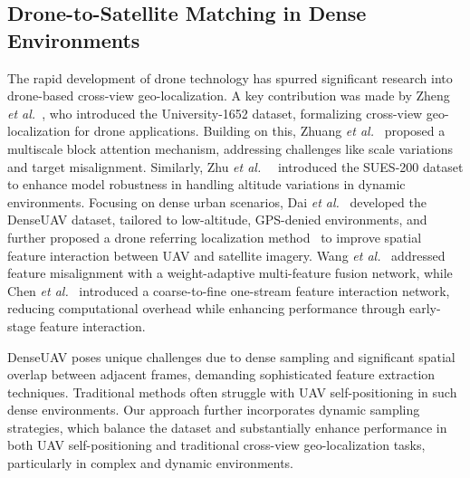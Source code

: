 \subsection{Drone-to-Satellite Matching in Dense Environments}
The rapid development of drone technology has spurred significant research into drone-based cross-view geo-localization.
A key contribution was made by Zheng \textit{et al.}~\cite{zheng2020university}, who introduced the University-1652 dataset, formalizing cross-view geo-localization for drone applications. Building on this, Zhuang \textit{et al.}~\cite{zhuang2021faster} proposed a multiscale block attention mechanism, addressing challenges like scale variations and target misalignment. Similarly, Zhu \textit{et al.}~~\cite{zhu2023sues} introduced the SUES-200 dataset to enhance model robustness in handling altitude variations in dynamic environments.
Focusing on dense urban scenarios, Dai \textit{et al.}~\cite{10376356} developed the DenseUAV dataset, tailored to low-altitude, GPS-denied environments, and further proposed a drone referring localization method~\cite{dai2022finding} to improve spatial feature interaction between UAV and satellite imagery. Wang \textit{et al.}~\cite{wang2023wamf} addressed feature misalignment with a weight-adaptive multi-feature fusion network, while Chen \textit{et al.}~\cite{chen2024fpi} introduced a coarse-to-fine one-stream feature interaction network, reducing computational overhead while enhancing performance through early-stage feature interaction.

DenseUAV poses unique challenges due to dense sampling and significant spatial overlap between adjacent frames, demanding sophisticated feature extraction techniques.
Traditional methods often struggle with UAV self-positioning in such dense environments.
Our approach further incorporates dynamic sampling strategies, which balance the dataset and substantially enhance performance in both UAV self-positioning and traditional cross-view geo-localization tasks, particularly in complex and dynamic environments.


